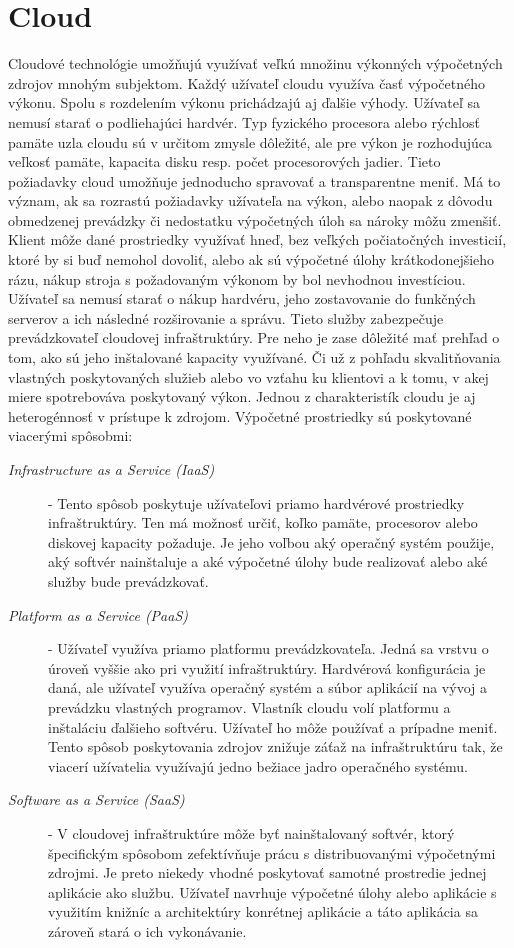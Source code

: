 \documentclass[11pt,final,oneside]{fithesis}
\begin{document}
\section{Cloud}
Cloudové technológie umožňujú využívať veľkú množinu výkonných výpočetných zdrojov mnohým subjektom. Každý užívateľ cloudu využíva časť výpočetného výkonu. Spolu s rozdelením výkonu prichádzajú aj ďalšie výhody. Užívateľ sa nemusí starať
o podliehajúci hardvér. Typ fyzického procesora alebo rýchlosť pamäte uzla cloudu sú v určitom zmysle dôležité, ale pre výkon je rozhodujúca veľkosť pamäte, kapacita disku resp. počet procesorových jadier. Tieto požiadavky
cloud umožňuje jednoducho spravovať a transparentne meniť. Má to význam, ak sa rozrastú požiadavky užívateľa na výkon, alebo naopak z dôvodu obmedzenej prevádzky či 
nedostatku výpočetných úloh sa nároky môžu zmenšiť. Klient môže dané prostriedky využívať hneď, bez veľkých počiatočných investicií, ktoré by si buď nemohol dovoliť, alebo ak sú výpočetné úlohy krátkodonejšieho rázu, nákup
stroja s požadovaným výkonom by bol nevhodnou investíciou. Užívateľ sa nemusí starať o nákup hardvéru, jeho zostavovanie do funkčných serverov a ich následné rozširovanie a správu. Tieto služby zabezpečuje prevádzkovateľ cloudovej infraštruktúry.
Pre neho je zase dôležité mať prehľad o tom, ako sú jeho inštalované kapacity využívané. Či už z pohľadu skvalitňovania vlastných poskytovaných služieb alebo vo vzťahu ku klientovi a k tomu, v akej miere spotrebováva poskytovaný výkon.
Jednou z charakteristík cloudu je aj heterogénnosť v prístupe k zdrojom. Výpočetné prostriedky sú poskytované viacerými spôsobmi:

\begin{description}
\item[\emph{Infrastructure as a Service (IaaS)}] - Tento spôsob poskytuje užívateľovi priamo hardvérové prostriedky infraštruktúry. Ten má možnosť určiť, koľko pamäte, procesorov alebo diskovej kapacity požaduje. Je jeho voľbou
aký operačný systém použije, aký softvér nainštaluje a aké výpočetné úlohy bude realizovať alebo aké služby bude prevádzkovať.
\item[\emph{Platform as a Service (PaaS)}] - Užívateľ využíva priamo platformu prevádzkovateľa. Jedná sa vrstvu o úroveň vyššie ako pri využití infraštruktúry. Hardvérová konfigurácia je daná, ale užívateľ využíva operačný systém a 
súbor aplikácií na vývoj a prevádzku vlastných programov. Vlastník cloudu volí platformu a inštaláciu ďalšieho softvéru. Užívateľ ho môže používať a prípadne meniť. Tento spôsob poskytovania zdrojov znižuje záťaž na infraštruktúru
tak, že viacerí užívatelia využívajú jedno bežiace jadro operačného systému.
\item[\emph{Software as a Service (SaaS)}] - V cloudovej infraštruktúre môže byť nainštalovaný softvér, ktorý špecifickým spôsobom zefektívňuje prácu s distribuovanými výpočetnými zdrojmi. Je preto niekedy vhodné poskytovať samotné
prostredie jednej aplikácie ako službu. Užívateľ navrhuje výpočetné úlohy alebo aplikácie s využitím knižníc a architektúry konrétnej aplikácie a táto aplikácia sa zároveň stará o ich vykonávanie. 
\end{description}
\end{document}
